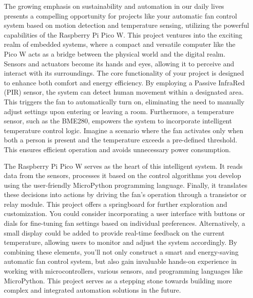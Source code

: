 \documentclass[12pt]{report}
\begin{document}
		The growing emphasis on sustainability and automation in our daily lives presents a compelling opportunity for projects like your automatic fan control system based on motion detection and temperature sensing, utilizing the powerful capabilities of the Raspberry Pi Pico W. This project ventures into the exciting realm of embedded systems, where a compact and versatile computer like the Pico W acts as a bridge between the physical world and the digital realm. Sensors and actuators become its hands and eyes, allowing it to perceive and interact with its surroundings. The core functionality of your project is designed to enhance both comfort and energy efficiency. By employing a Passive InfraRed (PIR) sensor, the system can detect human movement within a designated area. This triggers the fan to automatically turn on, eliminating the need to manually adjust settings upon entering or leaving a room.  Furthermore, a temperature sensor, such as the BME280, empowers the system to incorporate intelligent temperature control logic. Imagine a scenario where the fan activates only when both a person is present and the temperature exceeds a pre-defined threshold. This ensures efficient operation and avoids unnecessary power consumption.
		
		The Raspberry Pi Pico W serves as the heart of this intelligent system. It reads data from the sensors, processes it based on the control algorithms you develop using the user-friendly MicroPython programming language.  Finally, it translates these decisions into actions by driving the fan's operation through a transistor or relay module. This project offers a springboard for further exploration and customization. You could consider incorporating a user interface with buttons or dials for fine-tuning fan settings based on individual preferences.  Alternatively, a small display could be added to provide real-time feedback on the current temperature, allowing users to monitor and adjust the system accordingly. By combining these elements, you'll not only construct a smart and energy-saving automatic fan control system, but also gain invaluable hands-on experience in working with microcontrollers, various sensors, and programming languages like MicroPython. This project serves as a stepping stone towards building more complex and integrated automation solutions in the future.
		
	
	
	\clearpage
	
\end{document}
